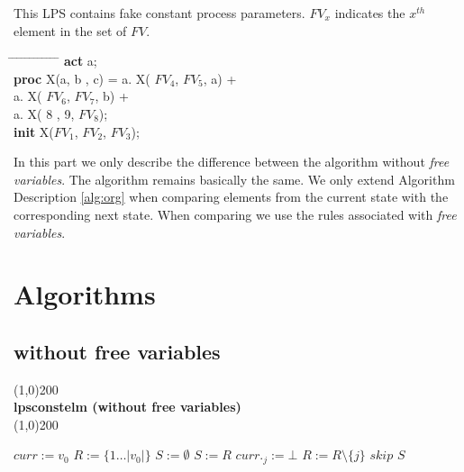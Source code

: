 \index{}\documentclass[a4paper,10pt]{article}
\theoremstyle{plain}
\theoremstyle{definition}
\newcommand{\pps}{process parameters}
\newcommand{\ti}{\textit}
\newcommand{\tb}{\textbf}
\newcommand{\tabw}{\hspace*{15.mm} \= \hspace*{20.mm} \= \hspace*{5.mm} \= \hspace*{5.mm} \= \hspace*{5.mm} \= \hspace*{5.mm}  \= \hspace*{5.mm}  \= \hspace*{5.mm}  \= \hspace*{5.mm} \= \hspace*{5.mm} \= \hspace*{5.mm}  \= \hspace*{5.mm}  \= \hspace*{5.mm}\kill}
\begin{document}
\begin{example}\label{freevarcheckup} This LPS contains fake constant \pps .  $FV_x$ indicates the $x^{th}$ element in the set of $FV$. 
\begin{tabbing}
\tabw
\tb{act} \> a; \\
\tb{proc} \> X(a, b , c) =     \>  a. X( $FV_4$, $FV_5$, a) + \\
\>                             \>  a. X( $FV_6$, $FV_7$, b) + \\
\>                             \>  a. X(   8 ,   9,  $FV_8$);  \\
\tb{init} \> X($FV_1$, $FV_2$, $FV_3$);
\end{tabbing}
\end{example}


In this part we only describe the difference between the algorithm without \ti{free variables}. The algorithm remains basically the same. We only extend Algorithm Description \ref{alg:org} when comparing elements from the current state with the corresponding next state. When comparing we use the rules associated with \ti{free variables}.

\newpage
\section{Algorithms}
\subsection{without free variables} \label{sec:alg}
\line(1,0){200}\\
\textbf{lpsconstelm (without free variables)}\\
\line(1,0){200}
\begin{algorithmic}[1]
\STATE $curr := v_0$
\STATE $R := \lbrace 1 \ldots \vert v_0 \vert \rbrace $
\STATE $S := \emptyset $
    \STATE $S := R$
              \STATE $curr._j := \bot$
              \STATE $R := R \setminus \lbrace j \rbrace$
              \STATE $skip$
          \ENDIF 
        \ENDFOR
    \ENDFOR 
  \ENDWHILE
\RETURN $S$
\end{algorithmic}

\newpage
\end{document}

